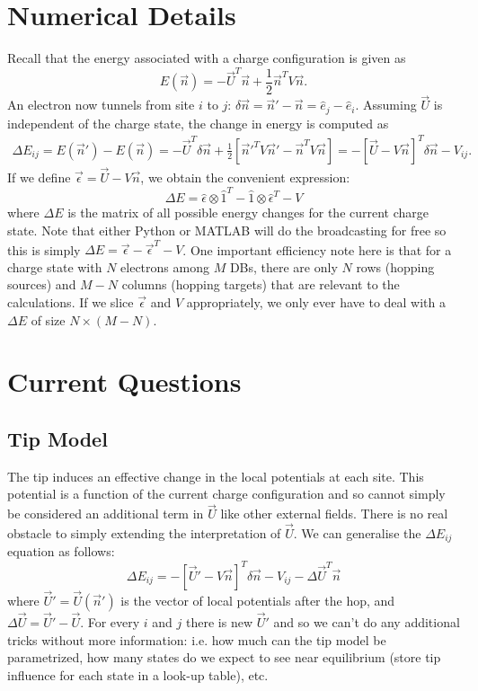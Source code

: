 \documentclass[11pt]{article}
\newcommand{\One}{\hat{1}}
\begin{document}
\section{Numerical Details}

Recall that the energy associated with a charge configuration is given as
\[
E(\vec{n}) = -\vec{U}^T\vec{n} + \frac{1}{2}\vec{n}^T V \vec{n}.
\]
An electron now tunnels from site $i$ to $j$: $\delta \vec{n} = \vec{n}' - \vec{n} = \hat{e}_j - \hat{e}_i$. Assuming $\vec{U}$ is independent of the charge state, the change in energy is computed as
\begin{align*}
\Delta E_{ij} = E(\vec{n}') - E(\vec{n}) = -\vec{U}^T \delta \vec{n}+ \frac{1}{2} \left[\vec{n}'^T V \vec{n}' - \vec{n}^T V \vec{n} \right] = -[\vec{U} - V\vec{n}]^T\delta \vec{n} - V_{ij}.
\end{align*}
If we define $\vec{\epsilon} = \vec{U} - V\vec{n}$, we obtain the convenient expression:
\begin{equation}
\Delta E = \hat{\epsilon} \otimes \One^T - \One \otimes \hat{\epsilon}^T - V
\end{equation}
where $\Delta E$ is the matrix of all possible energy changes for the current charge state. Note that either Python or MATLAB will do the broadcasting for free so this is simply $\Delta E = \vec{\epsilon} - \vec{\epsilon}^T - V$. One important efficiency note here is that for a charge state with $N$ electrons among $M$ DBs, there are only $N$ rows (hopping sources) and $M-N$ columns (hopping targets) that are relevant to the calculations. If we slice $\vec{\epsilon}$ and $V$ appropriately, we only ever have to deal with a $\Delta E$ of size $N \times (M-N)$.




\section{Current Questions}

\subsection{Tip Model}

The tip induces an effective change in the local potentials at each site. This potential is a function of the current charge configuration and so cannot simply be considered an additional term in $\vec{U}$ like other external fields. There is no real obstacle to simply extending the interpretation of $\vec{U}$. We can generalise the $\Delta E_{ij}$ equation as follows:
\begin{equation}
\Delta E_{ij} = -[\vec{U}' -V\vec{n}]^T \delta \vec{n} - V_{ij} - \Delta \vec{U}^T \vec{n}
\end{equation}
where $\vec{U}' = \vec{U}(\vec{n}')$ is the vector of local potentials after the hop, and $\Delta \vec{U} = \vec{U}' - \vec{U}$. For every $i$ and $j$ there is new $\vec{U}'$ and so we can't do any additional tricks without more information: i.e. how much can the tip model be parametrized, how many states do we expect to see near equilibrium (store tip influence for each state in a look-up table), etc.
\end{document}
